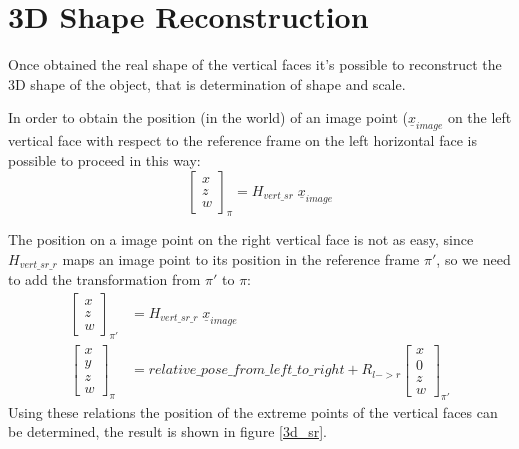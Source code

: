 \documentclass[11pt, oneside]{article}   	%
\begin{document}
\section{3D Shape Reconstruction}
Once obtained the real shape of the vertical faces it's possible to reconstruct the 3D shape of the object, that is determination of shape and scale.

In order to obtain the position (in the world) of an image point ($\underline{x}_{image}$ on the left vertical face with respect to the reference frame on the left horizontal face is possible to proceed in this way:
$$
\begin{bmatrix}
x \\
z \\
w
\end{bmatrix}_{\pi} = H_{vert\_sr} \; \underline{x}_{image}
$$

The position on a image point on the right vertical face is not as easy, since $H_{vert\_sr\_r}$ maps an image point to its position in the reference frame $\pi'$, so we need to add the transformation from $\pi'$ to $\pi$:
\begin{subequations}
\begin{align*}
\begin{bmatrix}
x \\
z \\
w
\end{bmatrix}_{\pi'} & = H_{vert\_sr\_r} \; \underline{x}_{image} \\
\begin{bmatrix}
x \\
y \\
z \\
w
\end{bmatrix}_{\pi} & = relative\_pose\_from\_left\_to\_right + R_{l->r} \begin{bmatrix}
x \\
0 \\
z \\
w
\end{bmatrix}_{\pi'}
\end{align*}
\end{subequations}
Using these relations the position of the extreme points of the vertical faces can be determined, the result is shown in figure \ref{3d_sr}.
\end{document}
